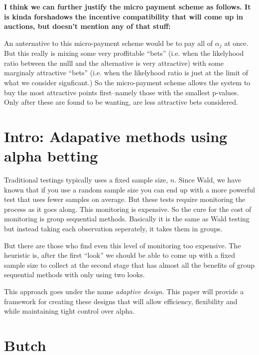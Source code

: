 \documentclass{article}
\begin{document}

{\bf I think we can further justify the micro payment scheme as
follows.  It is kinda forshadows the incentive compatibility that will
come up in auctions, but doesn't mention any of that stuff:

An anternative to this micro-payment scheme would be to pay all of
$\alpha_j$ at once.  But this really is mixing some very proffitable
``bets'' (i.e. when the likelyhood ratio between the nulll and the
alternative is very attractive) with some marginaly attractive
``bets'' (i.e. when the likelyhood ratio is just at the limit of what
we consider signficant.)  So the micro-payment scheme allows the
system to buy the most attractive points first--namely those with the
smallest p-values.  Only after these are found to be wanting, are less
attractive bets considered.


}



\section{Intro: Adapative methods using alpha betting}

Traditional testings typically uses a fixed sample size, $n$.  Since
 Wald, we have known that if you use a random sample size you can end
 up with a more powerful test that uses fewer samples on average.  But
 these tests require monitoring the process as it goes along.  This
 monitoring is expensive.  So the cure for the cost of monitoring is
 group sequential methods.  Basically it is the same as Wald testing
 but instead taking each observation seperately, it takes them in
 groups.

But there are those who find even this level of monitoring too
 expensive.  The heuristic is, after the first ``look'' we should be
 able to come up with a fixed sample size to collect at the second
 stage that has almost all the benefits of group sequential methods
 with only using two looks.

This approach goes under the name {\em adaptive design.}  This paper
 will provide a framework for creating these designs that will allow
 efficiency, flexibility and while maintaining tight control over
 alpha.


\section{Butch}
\end{document}
